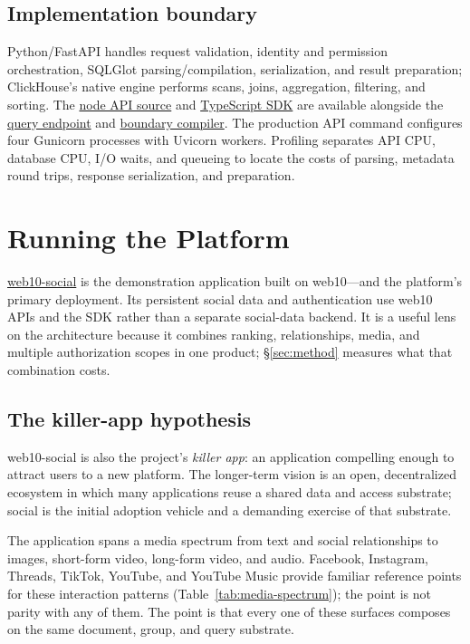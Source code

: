 \documentclass[sigconf, nonacm]{acmart}
\newcommand{\artifactbase}{https://github.com/jacoby149/web10}
\newcommand{\artifactrev}{317fa349eae714ddde07f249ca65cdaa34b6459b}
\newcommand{\artifactdir}[2]{\href{\artifactbase/tree/\artifactrev/#1}{#2}}
\newcommand{\artifactfile}[2]{\href{\artifactbase/blob/\artifactrev/#1}{#2}}
\begin{document}
\subsection{Implementation boundary}

Python/FastAPI handles request validation, identity and permission
orchestration, SQLGlot parsing/compilation, serialization, and result
preparation; ClickHouse's native engine performs scans, joins, aggregation,
filtering, and sorting. The \artifactdir{api/app}{node API source} and
\artifactdir{sdk/src}{TypeScript SDK} are available alongside the
\artifactfile{api/app/v3/endpoints/query.py}{query endpoint} and
\artifactfile{api/app/v3/services/safe_query.py}{boundary compiler}. The
production API command configures four Gunicorn processes with Uvicorn
workers. Profiling separates API CPU, database CPU, I/O waits, and queueing
to locate the costs of parsing, metadata round trips, response
serialization, and preparation.

\section{Running the Platform}
\label{sec:platform}

\artifactdir{marketing/web10-social/src}{web10-social} is the demonstration
application built on web10---and the platform's primary deployment. Its
persistent social data and authentication use web10 APIs and the SDK rather
than a separate social-data backend. It is a useful lens on the architecture
because it combines ranking, relationships, media, and multiple
authorization scopes in one product; \S\ref{sec:method} measures what that
combination costs.

\subsection{The killer-app hypothesis}

web10-social is also the project's \emph{killer app}: an application
compelling enough to attract users to a new platform. The longer-term vision
is an open, decentralized ecosystem in which many applications reuse a
shared data and access substrate; social is the initial adoption vehicle and
a demanding exercise of that substrate.

The application spans a media spectrum from text and social relationships to
images, short-form video, long-form video, and audio. Facebook, Instagram,
Threads, TikTok, YouTube, and YouTube Music provide familiar reference points
for these interaction patterns (Table~\ref{tab:media-spectrum}); the point is
not parity with any of them. The point is that every one of these surfaces
composes on the same document, group, and query substrate.
\end{document}
